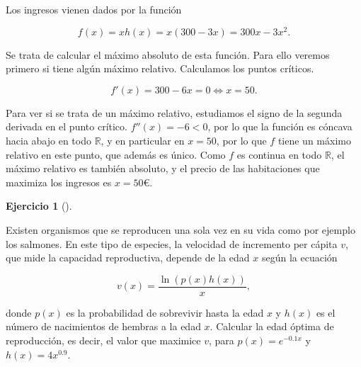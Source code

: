 \documentclass[
  spanish,
  a4paper,
]{scrreport}
\theoremstyle{definition}
\newtheorem{exercise}{Ejercicio}[chapter]
\theoremstyle{remark}
\begin{document}
\begin{tcolorbox}[enhanced jigsaw, arc=.35mm, bottomrule=.15mm, bottomtitle=1mm, breakable, colback=white, colbacktitle=quarto-callout-tip-color!10!white, colframe=quarto-callout-tip-color-frame, coltitle=black, left=2mm, leftrule=.75mm, opacityback=0, opacitybacktitle=0.6, rightrule=.15mm, title=\textcolor{quarto-callout-tip-color}{\faLightbulb}\hspace{0.5em}{Solución}, titlerule=0mm, toprule=.15mm, toptitle=1mm]

Los ingresos vienen dados por la función

\[
f(x) = xh(x)=x(300-3x) = 300x-3x^2.
\]

Se trata de calcular el máximo absoluto de esta función. Para ello
veremos primero si tiene algún máximo relativo. Calculamos los puntos
críticos.

\[
f'(x) = 300-6x = 0 \Leftrightarrow x=50.
\]

Para ver si se trata de un máximo relativo, estudiamos el signo de la
segunda derivada en el punto crítico. \(f''(x)=-6<0\), por lo que la
función es cóncava hacia abajo en todo \(\mathbb{R}\), y en particular
en \(x=50\), por lo que \(f\) tiene un máximo relativo en este punto,
que además es único. Como \(f\) es continua en todo \(\mathbb{R}\), el
máximo relativo es también absoluto, y el precio de las habitaciones que
maximiza los ingresos es \(x=50\)€.

\end{tcolorbox}

\begin{exercise}[]\protect\hypertarget{exr-extremos-7}{}\label{exr-extremos-7}

Existen organismos que se reproducen una sola vez en su vida como por
ejemplo los salmones. En este tipo de especies, la velocidad de
incremento per cápita \(v\), que mide la capacidad reproductiva, depende
de la edad \(x\) según la ecuación

\[
v(x) = \frac{\ln(p(x)h(x))}{x},
\]

donde \(p(x)\) es la probabilidad de sobrevivir hasta la edad \(x\) y
\(h(x)\) es el número de nacimientos de hembras a la edad \(x\).
Calcular la edad óptima de reproducción, es decir, el valor que maximice
\(v\), para \(p(x)=e^{-0.1x}\) y \(h(x)=4x^{0.9}\).

\end{exercise}
\end{document}
